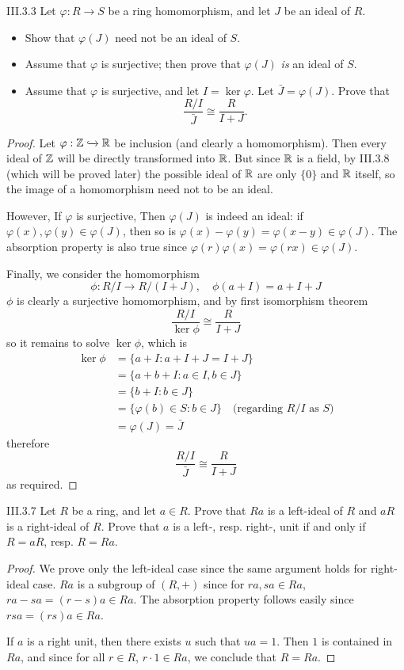 \begin{problem}{III.3.3}
Let $\varphi : R \to S$ be a ring homomorphism, and let $J$ be an ideal of $R$.
\end{problem}
\begin{itemize}
\setlength\itemsep{0pt}
\item Show that $\varphi(J)$ need not be an ideal of $S$.
\item Assume that $\varphi$ is surjective; then prove that $\varphi(J)$ \emph{is} an ideal of $S$.
\item Assume that $\varphi$ is surjective, and let $I = \ker \varphi$. Let $\bar{J} = \varphi(J)$. Prove that
\[
\frac{R/I}{\bar{J}} \cong \frac{R}{I+J}.
\]
\end{itemize}
\begin{proof}
Let $\varphi : \mathbb{Z} \xhookrightarrow{} \mathbb{R}$ be inclusion (and clearly a homomorphism). Then every ideal of $\mathbb{Z}$ will be directly transformed into $\mathbb{R}$. But since $\mathbb{R}$ is a field, by III.3.8 (which will be proved later) the possible ideal of $\mathbb{R}$ are only $\{0\}$ and $\mathbb{R}$ itself, so the image of a homomorphism need not to be an ideal.

However, If $\varphi$ is surjective, Then $\varphi(J)$ is indeed an ideal: if $\varphi(x), \varphi(y) \in \varphi(J)$, then so is $\varphi(x) - \varphi(y) = \varphi(x-y) \in \varphi(J)$. The absorption property is also true since $\varphi(r)\varphi(x) = \varphi(rx) \in \varphi(J)$.

Finally, we consider the homomorphism
\[
\phi : R/I \to R/(I+J), \quad \phi(a + I) = a + I + J
\]
$\phi$ is clearly a surjective homomorphism, and by first isomorphism theorem
\[
\frac{R/I}{\ker \phi} \cong \frac{R}{I+J}
\]
so it remains to solve $\ker \phi$, which is
\begin{align*}
\ker \phi &= \{a + I : a + I + J = I + J\} \\
&= \{a +b + I : a \in I, b \in J\} \\
&= \{b + I : b \in J\} \\
&= \{\varphi(b) \in S : b \in J\} \quad \text{(regarding } R/I \text{ as } S)\\
&= \varphi(J) = \bar{J}
\end{align*}
therefore
\[
\frac{R/I}{\bar{J}} \cong \frac{R}{I+J}
\]
as required.
\end{proof}

\begin{problem}{III.3.7}
Let $R$ be a ring, and let $a \in R$. Prove that $Ra$ is a left-ideal of $R$ and $aR$ is a right-ideal of $R$. Prove that $a$ is a left-, resp. right-, unit if and only if $R = aR$, resp. $R = Ra$.
\end{problem}
\begin{proof}
We prove only the left-ideal case since the same argument holds for right-ideal case. $Ra$ is a subgroup of $(R,+)$ since for $ra, sa \in Ra$, $ra - sa = (r-s)a \in Ra$. The absorption property follows easily since $rsa = (rs)a \in Ra$.

If $a$ is a right unit, then there exists $u$ such that $ua = 1$. Then $1$ is contained in $Ra$, and since for all $r\in R$, $r \cdot 1 \in Ra$, we conclude that $R = Ra$.
\end{proof}

